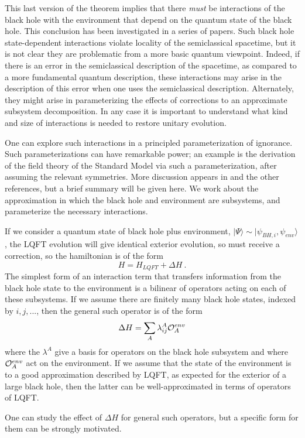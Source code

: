 \documentclass[11pt]{article}
\numberwithin{equation}{section}
\newcommand{\calo}{{\cal O}}
\newcommand{\beq}{\begin{equation}}
\newcommand{\eeq}{\end{equation}}
\begin{document}
This last version of the theorem implies that there {\it must} be interactions of the black hole with the environment that depend on the quantum state of the black hole.  This conclusion has been investigated in a series of papers\cite{SGmodels,BHQIUE,GiSh1,NVNL,NVUEFT,GiSh2,NVNLT,SGObs,NVU}.  Such black hole state-dependent interactions violate locality of the semiclassical spacetime, but it is not clear they are problematic from a more basic quantum viewpoint.  Indeed, if there is an error in the semiclassical description of the spacetime, as compared to a more fundamental quantum description, these interactions may arise in the description of this error when one uses the semiclassical description.  Alternately, they might arise in parameterizing the effects of corrections to an approximate subsystem decomposition.  In any case it is important to understand what kind and size of interactions is needed to restore unitary evolution.

One can explore such interactions in a principled parameterization of ignorance.  Such parameterizations can have remarkable power; an example is the derivation of the field theory of the Standard Model via such a parameterization, after assuming the relevant symmetries.  More discussion appears in \cite{BHQU} and the other references, but a brief summary will be given here.  We work about the approximation in which the black hole and environment are subsystems, and parameterize the necessary interactions.

If we consider a quantum state of black hole plus environment, $|\Psi\rangle \sim |\psi_{BH,i},\psi_{env}\rangle$, the LQFT evolution will give identical exterior evolution, so must receive a correction, so the hamiltonian is of the form
\beq
H=H_{LQFT} + \Delta H\ .
\eeq
 The simplest form of an interaction term that transfers information from the black hole state to the environment is a bilinear of operators acting on each of these subsystems.   If we assume there are finitely many black hole states, indexed by $i,j,...$, then the general such operator is of the form
 \beq
 \Delta H = \sum_A \lambda^A_{ij} {\cal O}^{env}_A
 \eeq
 where the $\lambda^A$ give a basis for operators on the black hole subsystem and where $\calo_A^{env}$ act on the environment.  If we assume that the state of the environment is to a good approximation described by LQFT, as expected for the exterior of a large black hole, then the latter can be well-approximated in terms of operators of LQFT.

One can study the effect of $\Delta H$ for general such operators\cite{NVUEFT,GiSh2}, but a specific form for them can be strongly motivated.  
\end{document}

